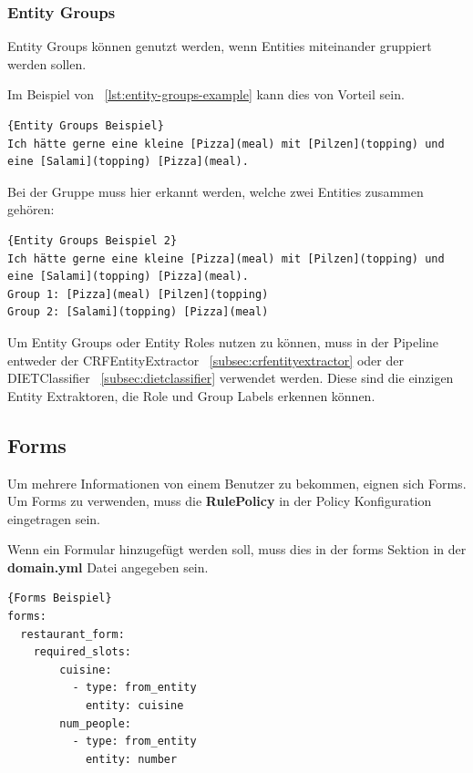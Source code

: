 \subsubsection{Entity Groups}\label{subsubsec:entity-groups}

Entity Groups können genutzt werden, wenn Entities miteinander gruppiert werden sollen.\cite{entityRolesGroups}

Im Beispiel von ~\ref{lst:entity-groups-example} kann dies von Vorteil sein.

\begin{lstlisting}[label={lst:entity-groups-example},caption={Entity Groups Beispiel}]{Entity Groups Beispiel}
Ich hätte gerne eine kleine [Pizza](meal) mit [Pilzen](topping) und eine [Salami](topping) [Pizza](meal).
\end{lstlisting}

Bei der Gruppe muss hier erkannt werden, welche zwei Entities zusammen gehören\cite{entityRolesGroups}:

\begin{lstlisting}[label={lst:entity-groups-example-2},caption={Entity Groups Beispiel 2}]{Entity Groups Beispiel 2}
Ich hätte gerne eine kleine [Pizza](meal) mit [Pilzen](topping) und eine [Salami](topping) [Pizza](meal).
Group 1: [Pizza](meal) [Pilzen](topping)
Group 2: [Salami](topping) [Pizza](meal)
\end{lstlisting}

Um Entity Groups oder Entity Roles nutzen zu können, muss in der Pipeline entweder der CRFEntityExtractor ~\ref{subsec:crfentityextractor} oder der DIETClassifier ~\ref{subsec:dietclassifier} verwendet werden.
Diese sind die einzigen Entity Extraktoren, die Role und Group Labels erkennen können.\cite{entityRolesGroups}

\subsection{Forms}\label{subsection:forms}

Um mehrere Informationen von einem Benutzer zu bekommen, eignen sich Forms.
Um Forms zu verwenden, muss die \textbf{RulePolicy} in der Policy Konfiguration eingetragen sein.\cite{forms}

Wenn ein Formular hinzugefügt werden soll, muss dies in der forms Sektion in der \textbf{domain.yml} Datei angegeben sein.

\begin{lstlisting}[label={lst:forms-example},caption={Forms Beispiel}]{Forms Beispiel}
forms:
  restaurant_form:
    required_slots:
        cuisine:
          - type: from_entity
            entity: cuisine
        num_people:
          - type: from_entity
            entity: number
\end{lstlisting}

